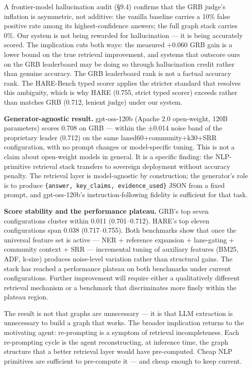A frontier-model hallucination audit (§9.4) confirms that the GRB judge's inflation is asymmetric, not additive: the vanilla baseline carries a 10\% false positive rate among its highest-confidence answers; the full graph stack carries 0\%. Our system is not being rewarded for hallucination --- it is being accurately scored. The implication cuts both ways: the measured +0.060 GRB gain is a lower bound on the true retrieval improvement, and systems that outscore ours on the GRB leaderboard may be doing so through hallucination credit rather than genuine accuracy. The GRB leaderboard rank is not a factual accuracy rank. The HARE-Bench typed scorer applies the stricter standard that resolves this ambiguity, which is why HARE (0.755, strict typed scorer) exceeds rather than matches GRB (0.712, lenient judge) under our system.

\textbf{Generator-agnostic result.} gpt-oss-120b (Apache 2.0 open-weight, 120B parameters) scores 0.708 on GRB --- within the ±0.014 noise band of the proprietary leader (0.712) on the same laned60+community+k30+SRR configuration, with no prompt changes or model-specific tuning. This is not a claim about open-weight models in general. It is a specific finding: the NLP-primitive retrieval stack transfers to sovereign deployment without accuracy penalty. The retrieval layer is model-agnostic by construction; the generator's role is to produce \texttt{\{answer,\ key\_claims,\ evidence\_used\}} JSON from a fixed prompt, and gpt-oss-120b's instruction-following fidelity is sufficient for that task.

\textbf{Score stability and the performance plateau.} GRB's top seven configurations cluster within 0.011 (0.701--0.712). HARE's top eleven configurations span 0.038 (0.717--0.755). Both benchmarks show that once the universal feature set is active --- NER + reference expansion + lane-gating + community context + SRR --- incremental tuning of auxiliary features (BM25, ADF, k-size) produces noise-level variation rather than structural gains. The stack has reached a performance plateau on both benchmarks under current configurations. Further improvement will require either a qualitatively different retrieval mechanism or a benchmark that discriminates more finely within the plateau region.

The result is not that graphs are unnecessary --- it is that LLM extraction is unnecessary to build a graph that works. The broader implication returns to the motivating agent: re-prompting is a symptom of retrieval incompleteness. Each re-prompting cycle is the agent reconstructing, at inference time, the graph structure that a better retrieval layer would have pre-computed. Cheap NLP primitives are sufficient to pre-compute it --- and cheap enough to keep current.

